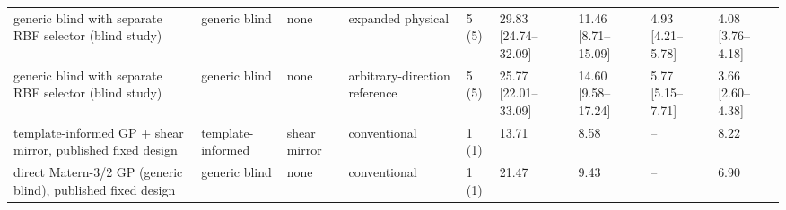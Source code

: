 \begin{table}[t]
\begin{tabular}{lllllllll}
generic blind with separate RBF selector (blind study) & generic blind & none & expanded physical & 5 (5) & 29.83 [24.74--32.09] & 11.46 [8.71--15.09] & 4.93 [4.21--5.78] & 4.08 [3.76--4.18] \\
generic blind with separate RBF selector (blind study) & generic blind & none & arbitrary-direction reference & 5 (5) & 25.77 [22.01--33.09] & 14.60 [9.58--17.24] & 5.77 [5.15--7.71] & 3.66 [2.60--4.38] \\
template-informed GP + shear mirror, published fixed design & template-informed & shear mirror & conventional & 1 (1) & 13.71 & 8.58 & -- & 8.22 \\
direct Matern-3/2 GP (generic blind), published fixed design & generic blind & none & conventional & 1 (1) & 21.47 & 9.43 & -- & 6.90 \\
\hline
\end{tabular}
\end{table}
